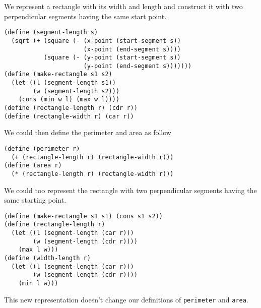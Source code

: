 \documentclass[a4paper,12pt]{article}
\begin{document}
We represent a rectangle with its width and length and construct
it with two perpendicular segments having the
same start point.
\begin{lstlisting}
(define (segment-length s)
  (sqrt (+ (square (- (x-point (start-segment s))
                      (x-point (end-segment s))))
           (square (- (y-point (start-segment s))
                      (y-point (end-segment s)))))))
(define (make-rectangle s1 s2)
  (let ((l (segment-length s1))
        (w (segment-length s2)))
    (cons (min w l) (max w l))))
(define (rectangle-length r) (cdr r))
(define (rectangle-width r) (car r))
\end{lstlisting}
We could then define the perimeter and area as follow
\begin{lstlisting}
(define (perimeter r)
  (+ (rectangle-length r) (rectangle-width r)))
(define (area r)
  (* (rectangle-length r) (rectangle-width r)))
\end{lstlisting}

\medskip \noindent
We could too represent the rectangle with two perpendicular segments
having the same starting point.
\begin{lstlisting}
(define (make-rectangle s1 s1) (cons s1 s2))
(define (rectangle-length r)
  (let ((l (segment-length (car r)))
        (w (segment-length (cdr r))))
    (max l w)))
(define (width-length r)
  (let ((l (segment-length (car r)))
        (w (segment-length (cdr r))))
    (min l w)))
\end{lstlisting}
This new representation doesn't change our definitions of
\lstinline!perimeter! and \lstinline!area!.
\end{document}

